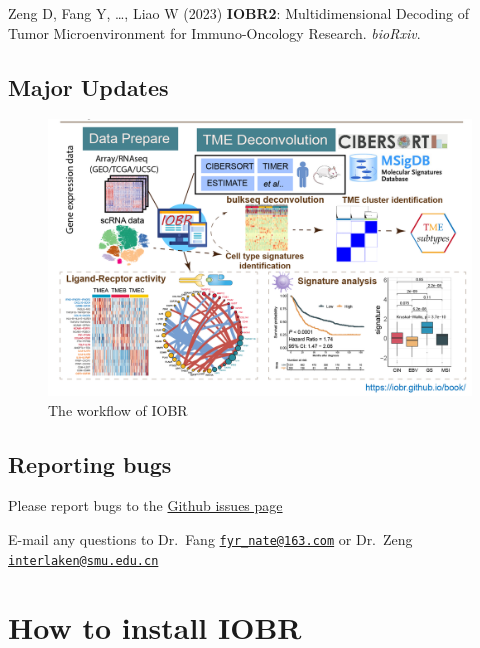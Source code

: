 \documentclass[
  12pt,
]{book}
\begin{document}
Zeng D, Fang Y, \ldots, Liao W (2023) \textbf{IOBR2}: Multidimensional Decoding of Tumor Microenvironment for Immuno-Oncology Research. \emph{bioRxiv}.

\hypertarget{major-updates}{%
\section{Major Updates}\label{major-updates}}

\begin{figure}

{\centering \includegraphics[width=0.95\linewidth]{./fig/IOBR-Workflow2} 

}

\caption{The workflow of IOBR}\label{fig:unnamed-chunk-2}
\end{figure}

\hypertarget{reporting-bugs}{%
\section{Reporting bugs}\label{reporting-bugs}}

Please report bugs to the \href{https://github.com/IOBR/IOBR/issues}{Github issues page}

E-mail any questions to Dr.~Fang \href{mailto:fyr_nate@163.com}{\nolinkurl{fyr\_nate@163.com}} or Dr.~Zeng \href{mailto:interlaken@smu.edu.cn}{\nolinkurl{interlaken@smu.edu.cn}}

\hypertarget{how-to-install-iobr}{%
\chapter{\texorpdfstring{\textbf{How to install IOBR}}{How to install IOBR}}\label{how-to-install-iobr}}
\end{document}

